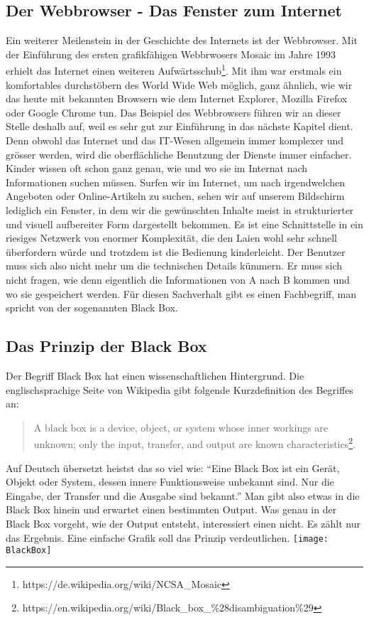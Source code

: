 \subsection{Der Webbrowser - Das Fenster zum Internet}
Ein weiterer Meilenstein in der Geschichte des Internets ist der Webbrowser. Mit der Einführung des ersten grafikfähigen Webbrwosers Mosaic im Jahre 1993 erhielt das Internet einen weiteren Aufwärtsschub\footnote{https://de.wikipedia.org/wiki/NCSA_Mosaic}. Mit ihm war erstmals ein komfortables durchstöbern des World Wide Web möglich, ganz ähnlich, wie wir das heute mit bekannten Browsern wie dem Internet Explorer, Mozilla Firefox oder Google Chrome tun. Das Beispiel des Webbrowsers führen wir an dieser Stelle deshalb auf, weil es sehr gut zur Einführung in das nächste Kapitel dient.
Denn obwohl das Internet und das IT-Wesen allgemein immer komplexer und grösser werden, wird die oberflächliche Benutzung der Dienste immer einfacher. Kinder wissen oft schon ganz genau, wie und wo sie im Internat nach Informationen suchen müssen. Surfen wir im Internet, um nach irgendwelchen Angeboten oder Online-Artikeln zu suchen, sehen wir auf unserem Bildschirm lediglich ein Fenster, in dem wir die gewünschten Inhalte meist in strukturierter und visuell aufbereiter Form dargestellt bekommen. Es ist eine Schnittstelle in ein riesiges Netzwerk von enormer Komplexität, die den Laien wohl sehr schnell überfordern würde und trotzdem ist die Bedienung kinderleicht. Der Benutzer muss sich also nicht mehr um die technischen Details kümmern. Er muss sich nicht fragen, wie denn eigentlich die Informationen von A nach B kommen und wo sie gespeichert werden. Für diesen Sachverhalt gibt es einen Fachbegriff, man spricht von der sogenannten Black Box.

\subsection{Das Prinzip der Black Box}
Der Begriff Black Box hat einen wissenschaftlichen Hintergrund. Die englischsprachige Seite von Wikipedia gibt folgende Kurzdefinition des Begriffes an: 
\begin{quote} 
A black box is a device, object, or system whose inner workings are unknown; only the input, transfer, and output are known characteristics\footnote{https://en.wikipedia.org/wiki/Black_box_\%28disambiguation\%29}.
\end{quote}
Auf Deutsch übersetzt heistst das so viel wie: ``Eine Black Box ist ein Gerät, Objekt oder System, dessen innere Funktionsweise unbekannt sind. Nur die Eingabe, der Transfer und die Ausgabe sind bekannt.''
Man gibt also etwas in die Black Box hinein und erwartet einen bestimmten Output. Was genau in der Black Box vorgeht, wie der Output entsteht, interessiert einen nicht. Es zählt nur das Ergebnis. Eine einfache Grafik soll das Prinzip verdeutlichen. 
\texttt{[image: BlackBox]}

